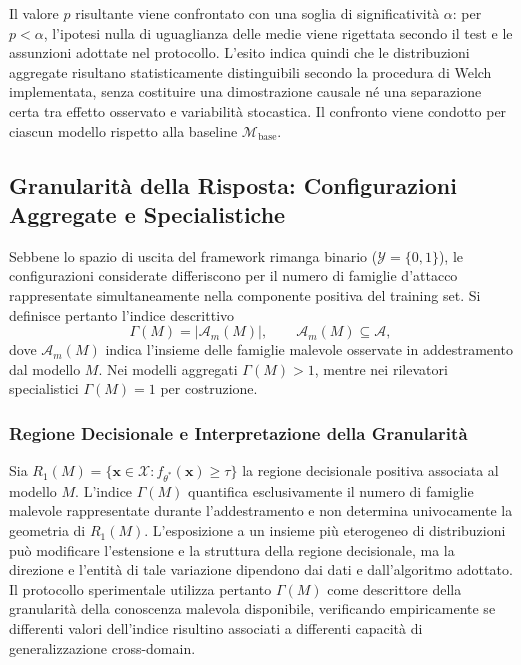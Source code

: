 Il valore $p$ risultante viene confrontato con una soglia di significatività $\alpha$: per $p<\alpha$, l'ipotesi nulla di uguaglianza delle medie viene rigettata secondo il test e le assunzioni adottate nel protocollo. L'esito indica quindi che le distribuzioni aggregate risultano statisticamente distinguibili secondo la procedura di Welch implementata, senza costituire una dimostrazione causale né una separazione certa tra effetto osservato e variabilità stocastica. Il confronto viene condotto per ciascun modello rispetto alla baseline $\mathcal{M}_{\text{base}}$.

\subsection{Granularità della Risposta: Configurazioni Aggregate e Specialistiche}
\label{subsec:granularita_risposta}

Sebbene lo spazio di uscita del framework rimanga binario ($\mathcal{Y}=\{0,1\}$), le configurazioni considerate differiscono per il numero di famiglie d'attacco rappresentate simultaneamente nella componente positiva del training set. Si definisce pertanto l'indice descrittivo
\begin{equation}
    \Gamma(M)=\left|\mathcal{A}_m(M)\right|, \qquad \mathcal{A}_m(M)\subseteq\mathcal{A},
    \label{eq:granularity_index}
\end{equation}
dove $\mathcal{A}_m(M)$ indica l'insieme delle famiglie malevole osservate in addestramento dal modello $M$. Nei modelli aggregati $\Gamma(M)>1$, mentre nei rilevatori specialistici $\Gamma(M)=1$ per costruzione.

\subsubsection{Regione Decisionale e Interpretazione della Granularità}
\label{subsubsec:regione_decisionale}
Sia $R_1(M)=\{\mathbf{x}\in\mathcal{X}: f_{\theta^*}(\mathbf{x})\geq\tau\}$ la regione decisionale positiva associata al modello $M$. L'indice $\Gamma(M)$ quantifica esclusivamente il numero di famiglie malevole rappresentate durante l'addestramento e non determina univocamente la geometria di $R_1(M)$. L'esposizione a un insieme più eterogeneo di distribuzioni può modificare l'estensione e la struttura della regione decisionale, ma la direzione e l'entità di tale variazione dipendono dai dati e dall'algoritmo adottato. Il protocollo sperimentale utilizza pertanto $\Gamma(M)$ come descrittore della granularità della conoscenza malevola disponibile, verificando empiricamente se differenti valori dell'indice risultino associati a differenti capacità di generalizzazione cross-domain.

